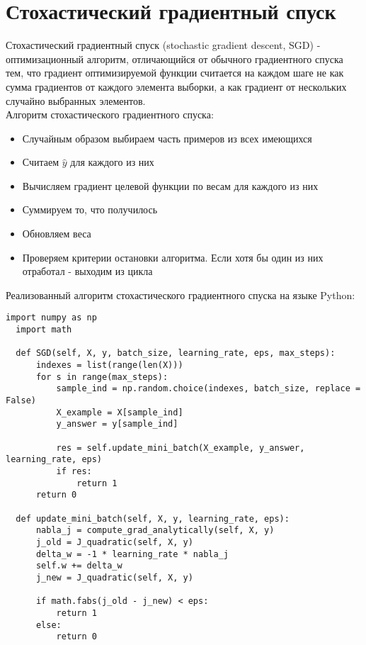 
\section{Стохастический градиентный спуск}

Стохастический градиентный спуск (stochastic gradient descent, SGD) - оптимизационный алгоритм, отличающийся от обычного градиентного спуска тем, что градиент оптимизируемой функции считается на каждом шаге не как сумма градиентов от каждого элемента выборки, а как градиент от нескольких случайно выбранных элементов. \\

Алгоритм стохастического градиентного спуска:
\begin{itemize}
  \item Случайным образом выбираем часть примеров из всех имеющихся
  \item Считаем $\hat{y}$ для каждого из них
  \item Вычисляем градиент целевой функции по весам для каждого из них 
  \item Суммируем то, что получилось
  \item Обновляем веса
  \item Проверяем критерии остановки алгоритма. Если хотя бы один из них отработал - выходим из цикла
\end{itemize}

Реализованный алгоритм стохастического градиентного спуска на языке Python:

\begin{lstlisting}[caption={Стохастический градиентный спуск}]
  import numpy as np
  import math
  
  def SGD(self, X, y, batch_size, learning_rate, eps, max_steps):
      indexes = list(range(len(X)))
      for s in range(max_steps):
          sample_ind = np.random.choice(indexes, batch_size, replace = False)
          X_example = X[sample_ind]
          y_answer = y[sample_ind]
              
          res = self.update_mini_batch(X_example, y_answer, learning_rate, eps) 
          if res: 
              return 1 
      return 0
  
  def update_mini_batch(self, X, y, learning_rate, eps):
      nabla_j = compute_grad_analytically(self, X, y)
      j_old = J_quadratic(self, X, y)
      delta_w = -1 * learning_rate * nabla_j
      self.w += delta_w
      j_new = J_quadratic(self, X, y)
      
      if math.fabs(j_old - j_new) < eps:
          return 1
      else:
          return 0
\end{lstlisting}